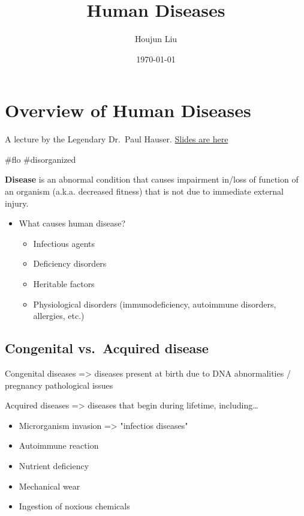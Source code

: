 \documentclass[letterpaper]{article}
\author{Houjun Liu}
\date{\today}
\title{Human Diseases}
\renewcommand\maketitle{}
\begin{document}
\maketitle


\section{Overview of Human Diseases}
\label{sec:org97a29c6}
A lecture by the Legendary Dr. Paul Hauser.
\href{https://docs.google.com/presentation/d/1b2RetU6iGsd\_h4Msb2SV-\_WznNXSREbsPpfdY-LgJZs/edit\#slide=id.ga6d683dbbf\_0\_338}{Slides
are here}

\#flo \#disorganized

\textbf{Disease} is an abnormal condition that causes impairment in/loss of
function of an organism (a.k.a. decreased fitness) that is not due to
immediate external injury.

\begin{itemize}
\item What causes human disease?

\begin{itemize}
\item Infectious agents
\item Deficiency disorders
\item Heritable factors
\item Physiological disorders (immunodeficiency, autoimmune disorders,
allergies, etc.)
\end{itemize}
\end{itemize}

\subsection{Congenital vs. Acquired disease}
\label{sec:org3e316b6}
Congenital diseases => diseases present at birth due to DNA
abnormalities / pregnancy pathological issues

Acquired diseases => diseases that begin during lifetime, including\ldots{}

\begin{itemize}
\item Microrganism invasion => "infectios diseases"
\item Autoimmune reaction
\item Nutrient deficiency
\item Mechanical wear
\item Ingestion of noxious chemicals
\end{itemize}
\end{document}
